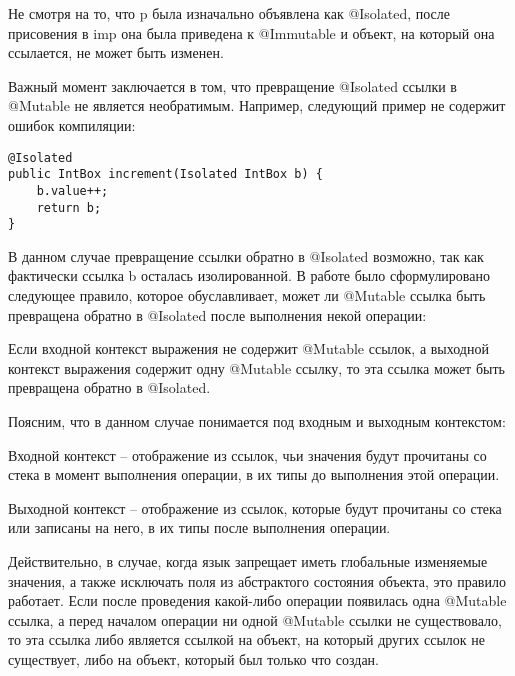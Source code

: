 Не смотря на то, что p была изначально объявлена как @Isolated, после присовения в imp она была приведена к @Immutable и объект, на который она ссылается, не может быть изменен.

Важный момент заключается в том, что превращение @Isolated ссылки в @Mutable не является необратимым. Например, следующий пример не содержит ошибок компиляции:

\begin{lstlisting}[caption=Превращение @Isolated ссылки в @Mutable и обратно, label=code:isolated_to_mutable_and_back]
@Isolated
public IntBox increment(Isolated IntBox b) { 
    b.value++; 
    return b;
}
\end{lstlisting}

В данном случае превращение ссылки обратно в @Isolated возможно, так как фактически ссылка b осталась изолированной. В работе \cite{Gordon2012} было сформулировано следующее правило, которое обуславливает, может ли @Mutable ссылка быть превращена обратно в @Isolated после выполнения некой операции:

\begin{Rule}\label{rule:convert_isolated}
Если входной контекст выражения не содержит @Mutable ссылок, а выходной контекст выражения содержит одну @Mutable ссылку, то эта ссылка может быть превращена обратно в @Isolated.
\end{Rule}

Поясним, что в данном случае понимается под входным и выходным контекстом:

\begin{Def}
Входной контекст -- отображение из ссылок, чьи значения будут прочитаны со стека в момент выполнения операции, в их типы до выполнения этой операции. 
\end{Def}

\begin{Def}
Выходной контекст -- отображение из ссылок, которые будут прочитаны со стека или записаны на него, в их типы после выполнения операции.
\end{Def}

Действительно, в случае, когда язык запрещает иметь глобальные изменяемые значения, а также исключать поля из абстрактого состояния объекта, это правило работает. Если после проведения какой-либо операции появилась одна @Mutable ссылка, а перед началом операции ни одной @Mutable ссылки не существовало, то эта ссылка либо является ссылкой на объект, на который других ссылок не существует, либо на объект, который был только что создан. 

